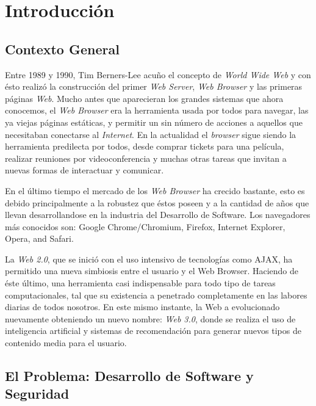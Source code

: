 


\chapter{Introducción}
\label{chap1:intro}

\section{Contexto General}
\label{chap1:CG}

Entre 1989 y 1990, Tim Berners-Lee acuño el concepto de \textit{World Wide Web} y con ésto realizó la construcción del primer \textit{Web Server}, \textit{Web Browser }y las primeras páginas \textit{Web}. Mucho antes que aparecieran los grandes sistemas que ahora conocemos, el \textit{Web Browser} era la herramienta usada por todos para navegar, las ya viejas páginas estáticas, y permitir un sin número de acciones a aquellos que necesitaban conectarse al \textit{Internet}. En la actualidad el \textit{browser} sigue siendo la herramienta predilecta por todos, desde comprar tickets para una película, realizar reuniones por videoconferencia y muchas otras tareas que invitan a nuevas formas de interactuar y comunicar.


En el último tiempo el mercado de los \textit{Web Browser} ha crecido bastante, esto es debido principalmente a la robustez que éstos poseen y a la cantidad de años que llevan desarrollandose en la industria del Desarrollo de Software. Los navegadores más conocidos son: Google Chrome/Chromium, Firefox, Internet Explorer, Opera, and Safari. 

La \textit{Web 2.0}, que se inició con el uso intensivo de tecnologías como AJAX, ha permitido una nueva simbiosis entre el usuario y el Web Browser. Haciendo de éste último, una herramienta casi indispensable para todo tipo de tareas computacionales, tal que su existencia a penetrado completamente en las labores diarias de todos nosotros. En este mismo instante, la Web a evolucionado nuevamente obteniendo un nuevo nombre: \textit{Web 3.0}, donde se realiza el uso de inteligencia artificial y sistemas de recomendación para generar nuevos tipos de contenido media para el usuario.


\section{El Problema: Desarrollo de Software y Seguridad}
\label{chap1:SD_SS}

